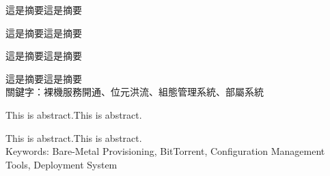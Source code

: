 \begin{abstractzh}
這是摘要這是摘要

這是摘要這是摘要

這是摘要這是摘要

這是摘要這是摘要\\
\newline
\noindent
關鍵字：裸機服務開通、位元洪流、組態管理系統、部屬系統
\end{abstractzh}



\begin{abstracten}
This is abstract.This is abstract.

This is abstract.This is abstract.
\\

\noindent
Keywords: Bare-Metal Provisioning, BitTorrent, Configuration Management Tools, Deployment System
\end{abstracten}
